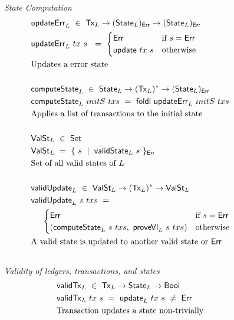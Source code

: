 \begin{figure*}[htb]
  \emph{State Computation}
  \begin{align*}
    & \mathsf{updateErr}_L ~\in~ \mathsf{Tx}_L \to (\mathsf{State}_L)_{\mathsf{Err}} \to (\mathsf{State}_L)_{\mathsf{Err}} \\
    & \mathsf{updateErr}_L ~tx~s~ ~=~
        \begin{cases}
          \mathsf{Err} & \text{if~} s = \mathsf{Err} \\
          \mathsf{update}~tx~s & \text{otherwise}
        \end{cases} \\
    & \text{Updates a error state} \\~\\
    & \mathsf{computeState}_L ~\in~ \mathsf{State}_L \to (\mathsf{Tx}_L)^{*} \to (\mathsf{State}_L)_{\mathsf{Err}} \\
    & \mathsf{computeState}_L~ initS ~txs ~=~
        \mathsf{foldl}~\mathsf{updateErr}_L~initS~txs \\
    & \text{Applies a list of transactions to the initial state} \\~\\
    & \mathsf{ValSt}_L ~\in~ \mathsf{Set} \\
    & \mathsf{ValSt}_L ~=~
        \{ ~s~ \mid ~\mathsf{validState}_L~s~\}_{\mathsf{Err}} \\
    & \text{Set of all valid states of $L$} \\~\\
    & \mathsf{validUpdate}_L ~\in~ \mathsf{ValSt}_L \to (\mathsf{Tx}_L)^{*} \to \mathsf{ValSt}_L\\
    & \mathsf{validUpdate}_L~s~txs ~=~\\
        &~~~~\begin{cases}
          \mathsf{Err} & \text{if~} s = \mathsf{Err} \\
          (\mathsf{computeState}_L~s~txs,~\mathsf{proveVl}_L~s~txs) & \text{otherwise}
        \end{cases} \\
    & \text{A valid state is updated to another valid state or $\mathsf{Err}$} \\~\\
  \end{align*}
  \emph{Validity of ledgers, transactions, and states}
  \begin{align*}
    & \fun{validTx}_L ~\in~ \type{Tx}_L \to \type{State}_L \to \Bool \\
    & \fun{validTx}_L~tx~s~ = ~\fun{update}_L ~tx~s~ \neq ~\Err \\
    & \text{Transaction updates a state non-trivially} \\~\\

\end{align*}
\end{figure*}
